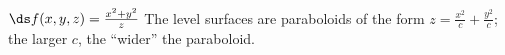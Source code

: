 {$\ds f(x,y,z) = \frac{x^2+y^2}{z}$
}
{The level surfaces are paraboloids of the form $z=\frac{x^2}{c}+\frac{y^2}{c}$; the larger $c$, the ``wider'' the paraboloid.
}